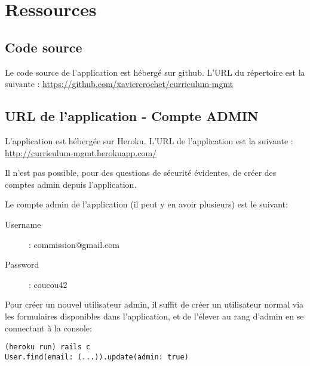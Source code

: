 \chapter{Ressources}
\label{ressources}
\section{Code source}
Le code source de l'application est hébergé sur github. L'URL du répertoire est la suivante : \url{https://github.com/xaviercrochet/curriculum-mgmt}
\section{URL de l'application - Compte ADMIN}
L'application est hébergée sur Heroku. L'URL de l'application est la suivante : \url{http://curriculum-mgmt.herokuapp.com/}

Il n'est pas possible, pour des questions de sécurité évidentes, de créer des comptes admin depuis l'application. 

Le compte admin de l'application (il peut y en avoir plusieurs) est le suivant:

\begin{description}
\item[Username] : commission@gmail.com
\item[Password] : coucou42
\end{description}

Pour créer un nouvel utilisateur admin, il suffit de créer un utilisateur normal via les formulaires disponibles dans l'application, et de l'élever au rang d'admin en se connectant à la console:

\begin{lstlisting}
(heroku run) rails c
User.find(email: (...)).update(admin: true)
\end{lstlisting} 